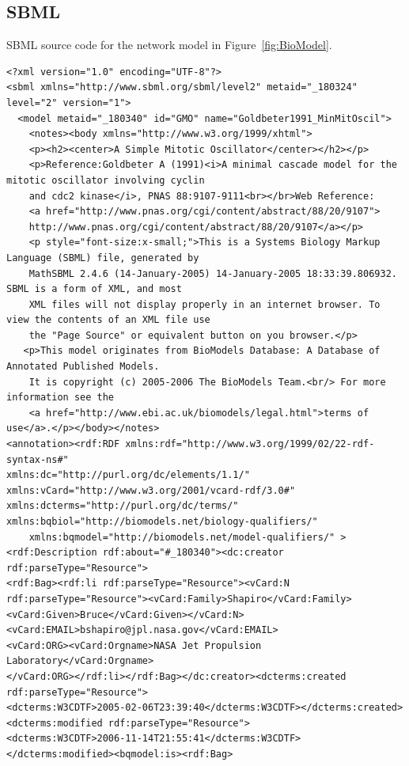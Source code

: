 \documentclass[a4paper,10pt,titlepage]{article}
\begin{document}
\pagebreak

\subsection*{SBML}

\normalsize{SBML source code for the network model in Figure~\ref{fig:BioModel}.}

\scriptsize

\begin{verbatim}
<?xml version="1.0" encoding="UTF-8"?>
<sbml xmlns="http://www.sbml.org/sbml/level2" metaid="_180324" level="2" version="1">
  <model metaid="_180340" id="GMO" name="Goldbeter1991_MinMitOscil">
    <notes><body xmlns="http://www.w3.org/1999/xhtml">
    <p><h2><center>A Simple Mitotic Oscillator</center></h2></p>
    <p>Reference:Goldbeter A (1991)<i>A minimal cascade model for the mitotic oscillator involving cyclin 
	and cdc2 kinase</i>, PNAS 88:9107-9111<br></br>Web Reference:
	<a href="http://www.pnas.org/cgi/content/abstract/88/20/9107">
	http://www.pnas.org/cgi/content/abstract/88/20/9107</a></p>
    <p style="font-size:x-small;">This is a Systems Biology Markup Language (SBML) file, generated by 
	MathSBML 2.4.6 (14-January-2005) 14-January-2005 18:33:39.806932. SBML is a form of XML, and most 
	XML files will not display properly in an internet browser. To view the contents of an XML file use 
	the "Page Source" or equivalent button on you browser.</p>
   <p>This model originates from BioModels Database: A Database of Annotated Published Models. 
	It is copyright (c) 2005-2006 The BioModels Team.<br/> For more information see the 
	<a href="http://www.ebi.ac.uk/biomodels/legal.html">terms of use</a>.</p></body></notes>
<annotation><rdf:RDF xmlns:rdf="http://www.w3.org/1999/02/22-rdf-syntax-ns#" 
xmlns:dc="http://purl.org/dc/elements/1.1/" 
xmlns:vCard="http://www.w3.org/2001/vcard-rdf/3.0#" 
xmlns:dcterms="http://purl.org/dc/terms/" xmlns:bqbiol="http://biomodels.net/biology-qualifiers/" 
	xmlns:bqmodel="http://biomodels.net/model-qualifiers/" >
<rdf:Description rdf:about="#_180340"><dc:creator rdf:parseType="Resource">
<rdf:Bag><rdf:li rdf:parseType="Resource"><vCard:N rdf:parseType="Resource"><vCard:Family>Shapiro</vCard:Family>
<vCard:Given>Bruce</vCard:Given></vCard:N><vCard:EMAIL>bshapiro@jpl.nasa.gov</vCard:EMAIL>
<vCard:ORG><vCard:Orgname>NASA Jet Propulsion Laboratory</vCard:Orgname>
</vCard:ORG></rdf:li></rdf:Bag></dc:creator><dcterms:created rdf:parseType="Resource">
<dcterms:W3CDTF>2005-02-06T23:39:40</dcterms:W3CDTF></dcterms:created><dcterms:modified rdf:parseType="Resource">
<dcterms:W3CDTF>2006-11-14T21:55:41</dcterms:W3CDTF></dcterms:modified><bqmodel:is><rdf:Bag>


\end{verbatim}
\end{document}
